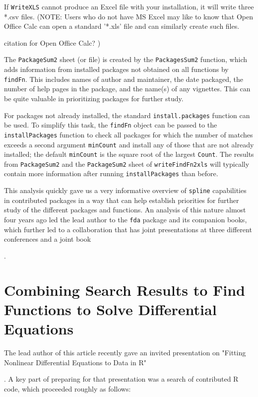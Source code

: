 If {\tt WriteXLS} cannot produce an Excel file with your
installation, it will write three *.csv files.  (NOTE:
Users who do not have MS Excel may like to know that
Open Office Calc can open a standard '*.xls' file and
can similarly create such files.


citation for Open Office Calc?
)

The {\tt PackageSum2} sheet (or file) is created by the
{\tt PackagesSum2} function, which adds information from
installed packages not obtained on all functions by
{\tt findFn}.  This includes names of author and maintainer,
the date packaged, the number of help pages in the package,
and the name(s) of any vignettes.  This can be quite
valuable in prioritizing packages for further study.

For packages not already installed, the standard
{\tt install.packages} function can be used.  To simplify this
task, the {\tt findFn} object can be passed to the
{\tt installPackages} function to check all packages for which
the number of matches exceeds a second argument {\tt minCount}
and install any of those that are not already installed;  the
default {\tt minCount} is the square root of the largest
{\tt Count}.  The results from {\tt PackageSum2} and the
{\tt PackageSum2} sheet of {\tt writeFindFn2xls} will typically
contain more information after running {\tt installPackages}
than before.

This analysis quickly gave us a very informative overview of
{\tt spline} capabilities in contributed \R{} packages in a way
that can help establish priorities for further study of the
different packages and functions.  An analysis of this nature 
almost four years ago led the lead author to the {\tt fda} 
package and its companion books, which further led to a 
collaboration that has joint presentations at three different
conferences and a joint book 

\citep{RHG09}

.  


\section*{Combining Search Results to Find Functions to Solve Differential Equations}

The lead author of this article recently gave an invited 
presentation on "Fitting Nonlinear Differential Equations to 
Data in R" 

\cite{GHR09} 

.  A key part of preparing for that presentation was a search 
of contributed R code, which proceeded roughly as follows:  

